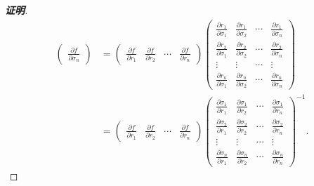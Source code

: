 \documentclass[a4paper]{article}
\newcommand{\pa}{\partial} \newcommand{\Om}{\Omega}
\begin{document}
\begin{proof}[\bf{证明}]
\begin{align*}
\begin{pmatrix}
    \frac{\pa f}{\pa \sigma_n}
  \end{pmatrix}&=\begin{pmatrix} \frac{\pa f}{\pa r_1}& \frac{\pa
      f}{\pa r_2}& \cdots& \frac{\pa f}{\pa r_n}
  \end{pmatrix}\begin{pmatrix}
    \frac{\pa r_1}{\pa \sigma_1}&\frac{\pa r_1}{\pa
      \sigma_2}&\cdots&\frac{\pa
      r_1}{\pa \sigma_n}\\
    \frac{\pa r_2}{\pa \sigma_1}&\frac{\pa r_2}{\pa
      \sigma_2}&\cdots&\frac{\pa
      r_2}{\pa \sigma_n}\\
    \vdots&\vdots&\cdots&\vdots\\
    \frac{\pa r_n}{\pa \sigma_1}&\frac{\pa r_n}{\pa
      \sigma_2}&\cdots&\frac{\pa r_n}{\pa \sigma_n}
  \end{pmatrix}\\&=\begin{pmatrix} \frac{\pa f}{\pa r_1}& \frac{\pa
      f}{\pa r_2}& \cdots& \frac{\pa f}{\pa r_n}
  \end{pmatrix}\begin{pmatrix}
    \frac{\pa \sigma_1}{\pa r_1}&\frac{\pa\sigma_1}{\pa
      r_2}&\cdots&\frac{\pa
      \sigma_1}{\pa r_n}\\
    \frac{\pa \sigma_2}{\pa r_1}&\frac{\pa \sigma_2}{\pa
      r_2}&\cdots&\frac{\pa
      \sigma_2}{\pa r_n}\\
    \vdots&\vdots&\cdots&\vdots\\
    \frac{\pa \sigma_n}{\pa r_1}&\frac{\pa\sigma_n}{\pa
      r_2}&\cdots&\frac{\pa \sigma_n}{\pa r_n}
  \end{pmatrix}^{-1}.
\end{align*}
\end{proof}
\end{document}
